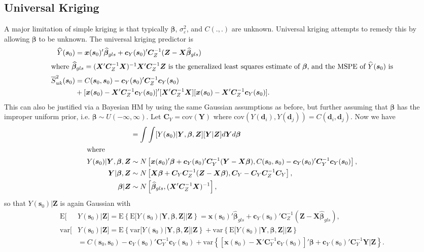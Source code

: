 \documentclass[12pt]{article}
\begin{document}
\subsection{Universal Kriging}
A major limitation of simple kriging is that typically $\bm{\beta}$, $\sigma^2_{\varepsilon}$, and $C(.,.)$ are unknown. Universal kriging attempts to remedy this by allowing $\bm{\beta}$ to be unknown. The universal kriging predictor is
\begin{align*}
\widehat{Y}(\bm{s}_0) &= \bm{x}(\bm{s}_0)'\widehat{\bm{\beta}}_{gls} + \bm{c}_Y(\bm{s}_0)'\bm{C}_Z^{-1}(\bm{Z} - \bm{X}\widehat{\bm{\beta}}_{gls})\\
\intertext{where $\widehat{\bm{\beta}}_{gls} = (\bm{X}'\bm{C}_Z^{-1}\bm{X})^{-1}\bm{X}'\bm{C}_Z^{-1}\bm{Z}$ is the generalized least squares estimate of $\bm{\beta}$, and the MSPE of $\widehat{Y}(\bm{s}_0)$ is}
\overline{S}_{uk}^2(\bm{s}_0) &= C(\bm{s}_0, \bm{s}_0) - \bm{c}_Y(\bm{s}_0)'\bm{C}_Z^{-1}\bm{c}_Y(\bm{s}_0)  \\
& + [\bm{x}(\bm{s}_0)  - \bm{X}'\bm{C}_Z^{-1}\bm{c}_Y(\bm{s}_0)]'[\bm{X}'\bm{C}_Z^{-1}\bm{X}][\bm{x}(\bm{s}_0)  - \bm{X}'\bm{C}_Z^{-1}\bm{c}_Y(\bm{s}_0)].
\end{align*}
This can also be justified via a Bayesian HM by using the same Gaussian assumptions as before, but further assuming that $\bm{\beta}$ has the improper uniform prior, i.e. $\bm{\beta} \sim U(-\infty, \infty)$. Let $\bm{C}_Y = \mathrm{cov}(\bm{Y})$ where $\mathrm{cov}(Y(\bm{d}_i),Y(\bm{d}_j)) = C(\bm{d}_i,\bm{d}_j)$. Now we have
\begin{align*}
[Y(\bm{s}_0)|\bm{Z}] &= \int \int [Y(\bm{s}_0)|\bm{Y}, \bm{\beta}, \bm{Z}][\bm{Y}|\bm{Z}]d\bm{Y}d\bm{\beta}\\
\intertext{where}
Y(\bm{s}_0)|\bm{Y},\bm{\beta}, \bm{Z} &\sim N\left[\bm{x}(\bm{s}_0)'\bm{\beta} + \bm{c}_Y(\bm{s}_0)'\bm{C}_Y^{-1}(\bm{Y} - \bm{X}\bm{\beta}), C(\bm{s}_0, \bm{s}_0) - \bm{c}_Y(\bm{s}_0)'\bm{C}_Y^{-1}\bm{c}_Y(\bm{s}_0)\right],\\
\bm{Y}|\bm{\beta},\bm{Z} &\sim N\left[\bm{X}\bm{\beta} + \bm{C}_Y\bm{C}_Z^{-1}(\bm{Z} - \bm{X}\bm{\beta}), \bm{C}_Y - \bm{C}_Y\bm{C}_Z^{-1}\bm{C}_Y\right],\\
\bm{\beta}|\bm{Z} &\sim N\left[\widehat{\bm{\beta}}_{gls}, (\bm{X}'\bm{C}_Z^{-1}\bm{X})^{-1}\right],
\end{align*}
so that $Y(\bm{s}_0)|\bm{Z}$ is again Gaussian with
\begin{align*}
\mathrm{E}[&Y(\bm{s}_0)|\bm{Z}] = \mathrm{E}\left\{\mathrm{E}[Y(\bm{s}_0)|\bm{Y},\bm{\beta}, \bm{Z}]|\bm{Z}\right\} = \bm{x}(\bm{s}_0)'\widehat{\bm{\beta}}_{gls} + \bm{c}_Y(\bm{s}_0)'\bm{C}_Z^{-1}(\bm{Z} - \bm{X}\widehat{\bm{\beta}}_{gls}),\\
\mathrm{var}[&Y(\bm{s}_0)|\bm{Z}]=\mathrm{E}\left\{\mathrm{var}[Y(\bm{s}_0)|\bm{Y},\bm{\beta},\bm{Z}]|\bm{Z}\right\} + \mathrm{var}\left\{\mathrm{E}[Y(\bm{s}_0)|\bm{Y},\bm{\beta},\bm{Z}]|\bm{Z}\right\}\\
&= C(\bm{s}_0, \bm{s}_0) - \bm{c}_Y(\bm{s}_0)'\bm{C}_Y^{-1}\bm{c}_Y(\bm{s}_0) + \mathrm{var}\left\{[\bm{x}(\bm{s}_0) - \bm{X}'\bm{C}_Y^{-1}\bm{c}_Y(\bm{s}_0)]'\bm{\beta} + \bm{c}_Y(\bm{s}_0)'\bm{C}_Y^{-1}\bm{Y}|\bm{Z}\right\}.
\end{align*}
\end{document}
